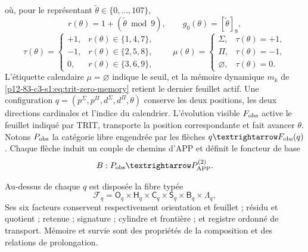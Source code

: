où, pour le représentant
\(\widetilde\theta\in\{0,\ldots,107\}\),
\[
r(\theta)=1+(\widetilde\theta\bmod9),
\qquad g_0(\theta)=[\widetilde\theta]_9,
\]
\[
\tau(\theta)=
\begin{cases}
+1,&r(\theta)\in\{1,4,7\},\\
-1,&r(\theta)\in\{2,5,8\},\\
0,&r(\theta)\in\{3,6,9\},
\end{cases}
\qquad
\mu(\theta)=
\begin{cases}
\Sigma,&\tau(\theta)=+1,\\
\Pi,&\tau(\theta)=-1,\\
\varnothing,&\tau(\theta)=0.
\end{cases}
\]
L'étiquette calendaire \(\mu=\varnothing\) indique le seuil, et la mémoire
dynamique \(m_k\) de \eqref{p12-83-c3-s1:eq:trit-zero-memory} retient le dernier feuillet
actif. Une configuration
\(q=(p^\Sigma,p^\Pi,d^\Sigma,d^\Pi,\theta)\) conserve les deux positions,
les deux directions cardinales et l'indice du calendrier. L'évolution
visible \(F_{\rm obs}\) active le feuillet indiqué par TRIT, transporte la
position correspondante et fait avancer \(\theta\). Notons
\(\mathsf P_{\rm obs}\) la catégorie libre engendrée par les flèches
\(q\to F_{\rm obs}(q)\). Chaque flèche induit un couple de chemins d'APP et
définit le foncteur de base
\begin{equation}
B:\mathsf P_{\rm obs}\longrightarrow\mathsf P_{\rm APP}^{(2)}.
\label{p12-83-c3-s1:eq:tpk-bivariant-base-functor}
\end{equation}

Au-dessus de chaque \(q\) est disposée la fibre typée
\begin{equation}
\mathcal F_q=
\mathsf O_q\times\mathsf H_q\times\mathsf C_q\times\mathsf S_q
\times\mathsf B_q\times\mathsf\Lambda_q,
\label{p12-83-c3-s1:eq:tpk-fiber}
\end{equation}
Ses six facteurs conservent respectivement orientation et feuillet ; résidu et
quotient ; retenue ; signature ; cylindre et frontière ; et registre ordonné de
transport. Mémoire et survie sont des propriétés de la composition et des
relations de prolongation.

